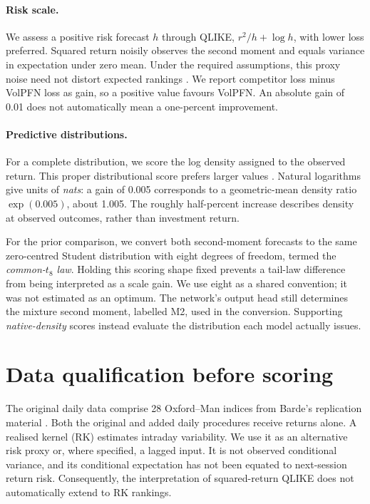 \paragraph{Risk scale.}
We assess a positive risk forecast $h$ through QLIKE, $r^2/h+\log h$, with lower loss preferred. Squared return noisily observes the second moment and equals variance in expectation under zero mean. Under the required assumptions, this proxy noise need not distort expected rankings \citep{patton2011volatility}. We report competitor loss minus VolPFN loss as gain, so a positive value favours VolPFN. An absolute gain of 0.01 does not automatically mean a one-percent improvement.

\paragraph{Predictive distributions.}
For a complete distribution, we score the log density assigned to the observed return. This proper distributional score prefers larger values \citep{gneiting2007strictly}. Natural logarithms give units of \emph{nats}: a gain of 0.005 corresponds to a geometric-mean density ratio $\exp(0.005)$, about 1.005. The roughly half-percent increase describes density at observed outcomes, rather than investment return.

For the prior comparison, we convert both second-moment forecasts to the same zero-centred Student distribution with eight degrees of freedom, termed the \emph{common-$t_8$ law}. Holding this scoring shape fixed prevents a tail-law difference from being interpreted as a scale gain. We use eight as a shared convention; it was not estimated as an optimum. The network's output head still determines the mixture second moment, labelled M2, used in the conversion. Supporting \emph{native-density} scores instead evaluate the distribution each model actually issues.

\section{Data qualification before scoring}

The original daily data comprise 28 Oxford--Man indices from Barde's replication material \citep{heber2009oxford,barde2024march}. Both the original and added daily procedures receive returns alone. A realised kernel (RK) estimates intraday variability. We use it as an alternative risk proxy or, where specified, a lagged input. It is not observed conditional variance, and its conditional expectation has not been equated to next-session return risk. Consequently, the interpretation of squared-return QLIKE does not automatically extend to RK rankings.

